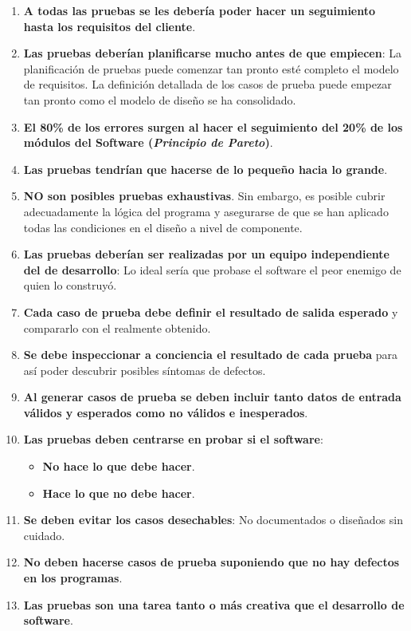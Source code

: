 \begin{enumerate}
    \item \textbf{A todas las pruebas se les debería poder hacer un seguimiento hasta los requisitos del cliente}.
    \item \textbf{Las pruebas deberían planificarse mucho antes de que empiecen}: La planificación de pruebas puede comenzar tan pronto esté completo el modelo de requisitos. La definición detallada de los casos de prueba puede empezar tan pronto como el modelo de diseño se ha consolidado.
    \item \textbf{El 80\% de los errores surgen al hacer el seguimiento del 20\% de los módulos del Software (\textit{Principio de Pareto})}.
    \item \textbf{Las pruebas tendrían que hacerse de lo pequeño hacia lo grande}.
    \item \textbf{NO son posibles pruebas exhaustivas}. Sin embargo, es posible cubrir adecuadamente la lógica del programa y asegurarse de que se han aplicado todas las condiciones en el diseño a nivel de componente.
    \item \textbf{Las pruebas deberían ser realizadas por un equipo independiente del de desarrollo}: Lo ideal sería que probase el software el peor enemigo de quien lo construyó.
    \item \textbf{Cada caso de prueba debe definir el resultado de salida esperado} y compararlo con el realmente obtenido.
    \item \textbf{Se debe inspeccionar a conciencia el resultado de cada prueba} para así poder descubrir posibles síntomas de defectos.
    \item \textbf{Al generar casos de prueba se deben incluir tanto datos de entrada válidos y esperados como no válidos e inesperados}.
    \item \textbf{Las pruebas deben centrarse en probar si el software}:
    \begin{itemize}
        \item \textbf{No hace lo que debe hacer}.
        \item \textbf{Hace lo que no debe hacer}.
    \end{itemize}
    \item \textbf{Se deben evitar los casos desechables}: No documentados o diseñados sin cuidado.
    \item \textbf{No deben hacerse casos de prueba suponiendo que no hay defectos en los programas}.
    \item \textbf{Las pruebas son una tarea tanto o más creativa que el desarrollo de software}.
\end{enumerate}




